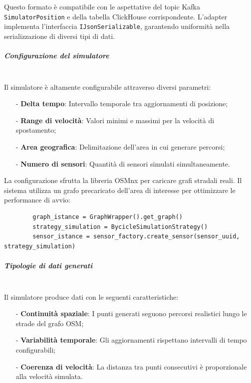 \documentclass[10pt]{article}
\newcommand{\mysubparagraph}[1]{\subparagraph{#1}\mbox{}\\}
\begin{document}
        Questo formato è compatibile con le aspettative del topic Kafka \texttt{SimulatorPosition} e della tabella ClickHouse corrispondente. L'adapter implementa l'interfaccia \texttt{IJsonSerializable}, garantendo uniformità nella serializzazione di diversi tipi di dati.

        \mysubparagraph{Configurazione del simulatore}
        Il simulatore è altamente configurabile attraverso diversi parametri:
        \begin{itemize}
            \item[-] \textbf{Delta tempo}: Intervallo temporale tra aggiornamenti di posizione;
            \item[-] \textbf{Range di velocità}: Valori minimi e massimi per la velocità di spostamento;
            \item[-] \textbf{Area geografica}: Delimitazione dell'area in cui generare percorsi;
            \item[-] \textbf{Numero di sensori}: Quantità di sensori simulati simultaneamente.
        \end{itemize}

        La configurazione sfrutta la libreria OSMnx per caricare grafi stradali reali. Il sistema utilizza un grafo precaricato dell'area di interesse per ottimizzare le performance di avvio:
        \begin{lstlisting}
        graph_istance = GraphWrapper().get_graph()
        strategy_simulation = BycicleSimulationStrategy()
        sensor_istance = sensor_factory.create_sensor(sensor_uuid, strategy_simulation)
        \end{lstlisting}

        \mysubparagraph{Tipologie di dati generati}
        Il simulatore produce dati con le seguenti caratteristiche:
        \begin{itemize}
            \item[-] \textbf{Continuità spaziale}: I punti generati seguono percorsi realistici lungo le strade del grafo OSM;
            \item[-] \textbf{Variabilità temporale}: Gli aggiornamenti rispettano intervalli di tempo configurabili;
            \item[-] \textbf{Coerenza di velocità}: La distanza tra punti consecutivi è proporzionale alla velocità simulata.
        \end{itemize}
\end{document}
